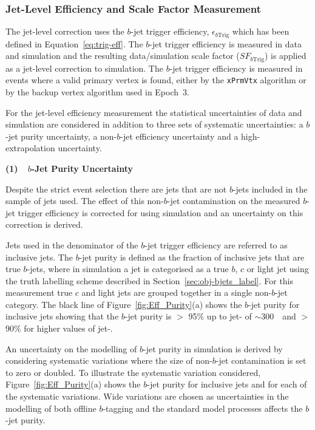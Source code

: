 \subsubsection{Jet-Level Efficiency and Scale Factor Measurement}
\label{sec:trig-jetLevelEff}

The jet-level correction uses the $b$-jet trigger efficiency, $\epsilon_{b\text{Trig}}$
which has been defined in Equation~\ref{eq:trig-eff}.
The $b$-jet trigger efficiency is measured in data and simulation
and the resulting data/simulation scale factor ($SF_{b\text{Trig}}$) is applied as a jet-level correction to simulation.
The $b$-jet trigger efficiency is measured in events where a valid primary vertex is found,
either by the \verb|xPrmVtx| algorithm or by the backup vertex algorithm used in Epoch~3.

For the jet-level efficiency measurement the 
statistical uncertainties of data and simulation are considered in addition
to three sets of systematic uncertainties:
a $b$-jet purity uncertainty,
a non-$b$-jet efficiency uncertainty
and a high-\pT{} extrapolation uncertainty.

\noindent
\textbf{(1)~~$b$-Jet Purity Uncertainty} 

Despite the strict event selection there are
jets that are not $b$-jets included in the sample of jets used.
The effect of this non-$b$-jet contamination on the measured $b$-jet trigger efficiency
is corrected for using simulation and an uncertainty on this correction is derived.

Jets used in the denominator of the $b$-jet trigger efficiency are referred to as inclusive jets.
The $b$-jet purity is defined as the fraction of inclusive jets that are true $b$-jets,
where in simulation a jet is categorised as a true $b$,  $c$ or light jet using 
the truth labelling scheme described in Section~\ref{sec:obj-bjets_label}.
For this measurement true $c$ and light jets are grouped together in a single non-$b$-jet category.
The black line of Figure~\ref{fig:Eff_Purity}(a) shows the $b$-jet purity for inclusive jets showing that 
the $b$-jet purity is $>$ 95\% up to jet-\pT{} of $\sim$300~\GeV~and $>$ 90\% for higher values of jet-\pT.

An uncertainty on the modelling of $b$-jet purity in simulation is derived by considering systematic variations where the
size of non-$b$-jet contamination is set to zero or doubled.
To illustrate the systematic variation considered, Figure~\ref{fig:Eff_Purity}(a) shows the $b$-jet purity for inclusive jets and for each of the systematic variations.
Wide variations are chosen as uncertainties in the modelling of both offline $b$-tagging and the standard model processes affects the $b$-jet purity.


